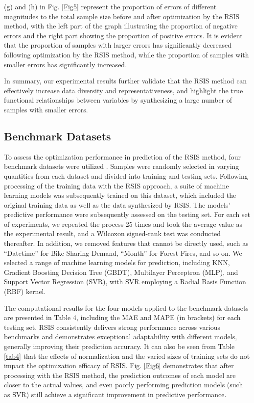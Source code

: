 \documentclass[final,3p,times]{elsarticle}
\begin{document}
(g) and (h) in Fig. \ref{Fig5} represent the proportion of errors 
of different magnitudes to the total sample size before and after 
optimization by the RSIS method, with the left part of the graph 
illustrating the proportion of negative errors and the right part 
showing the proportion of positive errors. It is evident that the 
proportion of samples with larger errors has significantly 
decreased following optimization by the RSIS method, while the 
proportion of samples with smaller errors has significantly 
increased. 

{\color{myred}In summary, our experimental results further validate that the RSIS method can effectively increase data diversity and representativeness, and highlight the true functional relationships between variables by synthesizing a large number of samples with smaller errors.}


\subsection{Benchmark Datasets}
To assess the optimization performance in prediction of the RSIS 
method, four benchmark datasets were utilized \cite{bib84,bib85,bib86,bib87}. Samples 
were randomly selected in varying quantities from each dataset 
and divided into training and testing sets. Following 
processing of the training data with the RSIS approach, a 
suite of machine learning models was subsequently trained on 
this dataset,
{\color{myred}which included the original training data as well as the data synthesized by RSIS.}
 The models' predictive performance were subsequently 
assessed on the testing set. For each set of experiments, we 
repeated the process 25 times and took the average value as the 
experimental result, and a Wilcoxon signed-rank test was 
conducted thereafter. In addition, we removed features that 
cannot be directly used, such as “Datetime” for Bike Sharing 
Demand, “Month” for Forest Fires, and so on. We selected a range 
of machine learning models for prediction, including KNN, 
Gradient Boosting Decision Tree (GBDT), Multilayer Perceptron 
(MLP), and Support Vector Regression (SVR), with SVR employing a 
Radial Basis Function (RBF) kernel. 



The computational results for the four models applied to the 
benchmark datasets are presented in Table 4, including the MAE 
and MAPE (in brackets) for each testing set. RSIS consistently 
delivers strong performance across various benchmarks and 
demonstrates exceptional adaptability with different models, 
generally improving their prediction accuracy. It can also be 
seen from Table \ref{tab4} that the effects of normalization 
and the varied sizes of training sets do not impact the 
optimization efficacy of RSIS. Fig. \ref{Fig6} demonstrates 
that after processing with the RSIS method, the prediction outcomes 
of each model are closer to the actual values, and even poorly 
performing prediction models (such as SVR) still achieve a 
significant improvement in predictive performance. 
\end{document}
